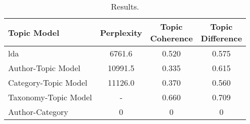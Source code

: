 \begin{table}[h]
	\centering
	\caption{Results.}
	\begin{tabular}{l|c|c|c}
		Topic Model & Perplexity & \makecell{Topic \\ Coherence} & \makecell{Topic \\ Difference} \\
		\midrule
		\Acrlong{lda} & 6761.6 & 0.520 & 0.575 \\
		Author-Topic Model & 10991.5 & 0.335 & 0.615 \\
		Category-Topic Model & 11126.0 & 0.370 & 0.560 \\
		Taxonomy-Topic Model & - & 0.660 & 0.709 \\
		Author-Category & 0 & 0 & 0 \\
	\end{tabular}
	\label{tab:metric_results}
\end{table}